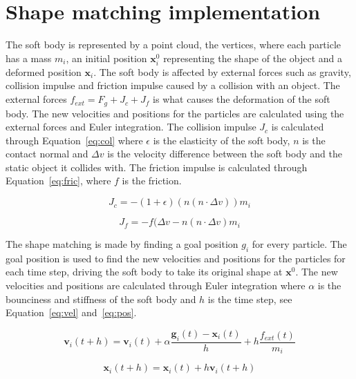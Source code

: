 \section{Shape matching implementation}
    The soft body is represented by a point cloud, the vertices, where each particle has a mass $m_i$, an initial position $\mathbf{x}_i^0$ representing the shape of the object and a deformed position $\mathbf{x}_i$.
    The soft body is affected by external forces such as gravity, collision impulse and friction impulse caused by a collision with an object.
    The external forces $f_{ext} = F_g + J_c + J_f$ is what causes the deformation of the soft body.
    The new velocities and positions for the particles are calculated using the external forces and Euler integration.
    The collision impulse $J_c$ is calculated through Equation~\ref{eq:col} where $\epsilon$ is the elasticity of the soft body, $n$ is the contact normal and $\Delta{v}$ is the velocity difference between the soft body and the static object it collides with.
    The friction impulse is calculated through Equation~\ref{eq:fric}, where $f$ is the friction.

    \begin{equation} \label{eq:col}
        J_c = -(1 + \epsilon)(n(n\cdot{\Delta{v}}))m_i
    \end{equation}

    \begin{equation} \label{eq:fric}
        J_f = -f(\Delta{v} - n(n\cdot{\Delta{v}})m_i
    \end{equation}

    The shape matching is made by finding a goal position $g_i$ for every particle.
    The goal position is used to find the new velocities and positions for the particles for each time step, driving the soft body to take its original shape at $\mathbf{x}^0$.
    The new velocities and positions are calculated through Euler integration where $\alpha$ is the bounciness and stiffness of the soft body and $h$ is the time step, see Equation~\ref{eq:vel} and~\ref{eq:pos}.

    \begin{equation} \label{eq:vel}
        \mathbf{v}_i(t + h) = \mathbf{v}_i(t) + \alpha{\frac{\mathbf{g}_i(t) - \mathbf{x}_i(t)}{h}} + h \frac{f_{ext}(t)}{m_i}
    \end{equation}

    \begin{equation} \label{eq:pos}
        \mathbf{x}_i(t + h) = \mathbf{x}_i(t) + h\mathbf{v}_i(t + h) 
    \end{equation}

